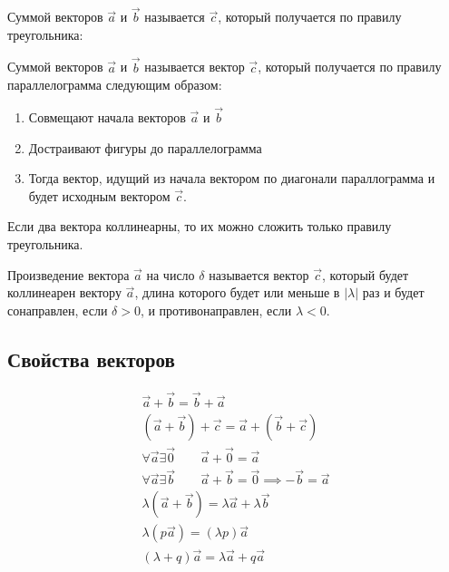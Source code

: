 \begin{definition}
  Суммой векторов $\vec{a}$ и $\vec{b}$ называется $\vec{c}$, который получается по правилу треугольника:
\end{definition}

\begin{definition}
  Суммой векторов $$ и $$ называется вектор $$, который получается по правилу параллелограмма следующим образом:
  \begin{enumerate}
    \item Совмещают начала векторов $$ и $$
    \item Достраивают фигуры до параллелограмма
    \item Тогда вектор, идущий из начала вектором по диагонали параллограмма и будет исходным вектором $$.
  \end{enumerate}
\end{definition}

\begin{note}
  Если два вектора коллинеарны, то их можно сложить только правилу треугольника.
\end{note}

\begin{definition}
  Произведение вектора $$ на число $\delta$ называется вектор $$, который будет коллинеарен вектору $$, длина которого будет или меньше в $|\lambda|$ раз и будет сонаправлен, если $\delta > 0$, и противонаправлен, если $\lambda < 0$.
\end{definition}

\subsection{Свойства векторов}
\begin{gather}
  \vec{a} + \vec{b} = \vec{b} + \vec{a} \\
  (\vec{a} + \vec{b}) + \vec{c} = \vec{a} + (\vec{b} + \vec{c}) \\
  \forall \vec{a} \exists \vec{0} \qquad \vec{a} + \vec{0} = \vec{a} \\
  \forall \vec{a} \exists \vec{b} \qquad \vec{a} + \vec{b} = \vec{0} \implies -\vec{b} = \vec{a} \\
  \lambda\left( \vec{a} + \vec{b} \right) = \lambda \vec{a} + \lambda \vec{b} \\
  \lambda(p \vec{a}) = \left( \lambda p \right) \vec{a} \\
  \left( \lambda  + q\right) \vec{a} = \lambda \vec{a} + q \vec{a}
\end{gather}

